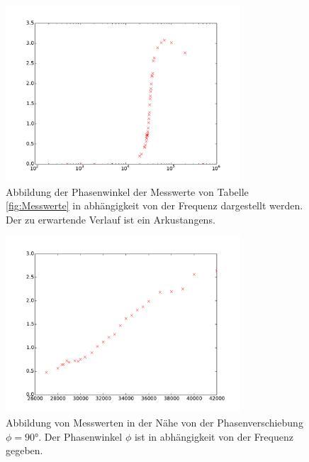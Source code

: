 \begin{figure}
  \centering
  \includegraphics[width=0.78\textwidth]{phasenverschiebung.pdf}
  \caption{Abbildung der Phasenwinkel der Messwerte von Tabelle \ref{fig:Messwerte} in
  abhängigkeit von der Frequenz dargestellt werden. Der zu erwartende Verlauf ist
  ein Arkustangens.}
  \label{fig:phasenverschiebung}
\end{figure}
\begin{figure}
  \centering
  \includegraphics[width=0.78\textwidth]{linphasenverschiebung.pdf}
  \caption{Abbildung von Messwerten in der Nähe von der Phasenverschiebung $\phi=90°$.
          Der Phasenwinkel $\phi$ ist in abhängigkeit von der Frequenz gegeben.}
  \label{fig:linphasenverschiebung}
\end{figure}
